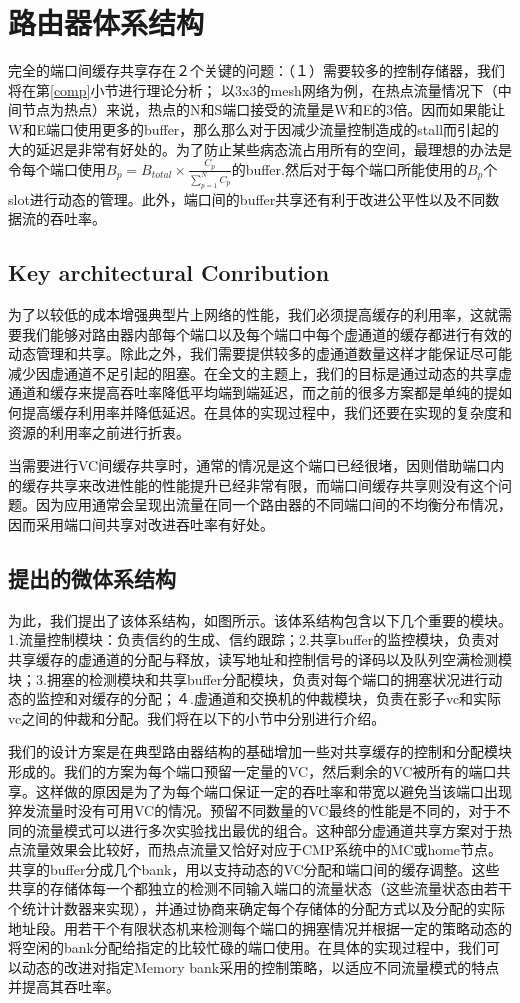﻿\documentclass[10pt,journal]{IEEEtran}
\begin{document}
\section{路由器体系结构}\label{implemented}
完全的端口间缓存共享存在２个关键的问题：（１）需要较多的控制存储器，我们将在第\ref{comp}小节进行理论分析；
以3x3的mesh网络为例，在热点流量情况下（中间节点为热点）来说，热点的N和S端口接受的流量是W和E的3倍。因而如果能让W和E端口使用更多的buffer，那么那么对于因减少流量控制造成的stall而引起的大的延迟是非常有好处的。为了防止某些病态流占用所有的空间，最理想的办法是令每个端口使用$B_p=B_{total}\times\frac{C_p}{\sum_{p=1}^NC_p}$的buffer.然后对于每个端口所能使用的$B_p$个slot进行动态的管理。此外，端口间的buffer共享还有利于改进公平性以及不同数据流的吞吐率。

\subsection{Key architectural Conribution}
为了以较低的成本增强典型片上网络的性能，我们必须提高缓存的利用率，这就需要我们能够对路由器内部每个端口以及每个端口中每个虚通道的缓存都进行有效的动态管理和共享。除此之外，我们需要提供较多的虚通道数量这样才能保证尽可能减少因虚通道不足引起的阻塞。在全文的主题上，我们的目标是通过动态的共享虚通道和缓存来提高吞吐率降低平均端到端延迟，而之前的很多方案都是单纯的提如何提高缓存利用率并降低延迟。在具体的实现过程中，我们还要在实现的复杂度和资源的利用率之前进行折衷。

当需要进行VC间缓存共享时，通常的情况是这个端口已经很堵，因则借助端口内的缓存共享来改进性能的性能提升已经非常有限，而端口间缓存共享则没有这个问题。因为应用通常会呈现出流量在同一个路由器的不同端口间的不均衡分布情况，因而采用端口间共享对改进吞吐率有好处。

\subsection{提出的微体系结构}
为此，我们提出了该体系结构，如图所示。该体系结构包含以下几个重要的模块。1.流量控制模块：负责信约的生成、信约跟踪；2.共享buffer的监控模块，负责对共享缓存的虚通道的分配与释放，读写地址和控制信号的译码以及队列空满检测模块；3.拥塞的检测模块和共享buffer分配模块，负责对每个端口的拥塞状况进行动态的监控和对缓存的分配；４.虚通道和交换机的仲裁模块，负责在影子vc和实际vc之间的仲裁和分配。我们将在以下的小节中分别进行介绍。

我们的设计方案是在典型路由器结构的基础增加一些对共享缓存的控制和分配模块形成的。我们的方案为每个端口预留一定量的VC，然后剩余的VC被所有的端口共享。这样做的原因是为了为每个端口保证一定的吞吐率和带宽以避免当该端口出现猝发流量时没有可用VC的情况。预留不同数量的VC最终的性能是不同的，对于不同的流量模式可以进行多次实验找出最优的组合。这种部分虚通道共享方案对于热点流量效果会比较好，而热点流量又恰好对应于CMP系统中的MC或home节点。共享的buffer分成几个bank，用以支持动态的VC分配和端口间的缓存调整。这些共享的存储体每一个都独立的检测不同输入端口的流量状态（这些流量状态由若干个统计计数器来实现），并通过协商来确定每个存储体的分配方式以及分配的实际地址段。用若干个有限状态机来检测每个端口的拥塞情况并根据一定的策略动态的将空闲的bank分配给指定的比较忙碌的端口使用。在具体的实现过程中，我们可以动态的改进对指定Memory bank采用的控制策略，以适应不同流量模式的特点并提高其吞吐率。
\end{document}
